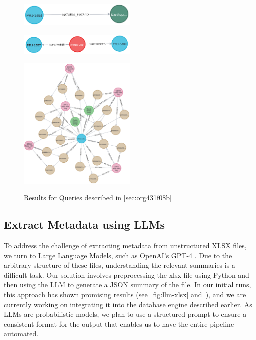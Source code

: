 \documentclass[acmsmall]{acmart}
\begin{document}
\begin{figure}
\begin{minipage}[c][5cm][t]{.5\textwidth}
  \vspace*{\fill}
  \centering
  \includegraphics[width=0.5\textwidth]{figures/query1.png}
  \label{fig:test2}\par\vfill
  \includegraphics[width=0.5\textwidth]{figures/query2.png}
  \label{fig:test3}
\end{minipage}%
\begin{minipage}[c][5cm][t]{.5\textwidth}
  \vspace*{\fill}
  \centering
  \includegraphics[width=0.5\textwidth]{figures/query3.png}
  \label{fig:test1}
\end{minipage}
\label{fig:queries}
\caption{Results for Queries described in \cref{sec:org431f08b}}
\end{figure}

\subsection{Extract Metadata using LLMs}
To address the challenge of extracting metadata from unstructured XLSX files, we turn to Large Language Models, such as OpenAI's GPT-4 \cite{openai2023gpt4}. 
Due to the arbitrary structure
of these files, understanding the relevant summaries is a difficult task. 
Our solution involves preprocessing the xlsx file using Python and then using the 
LLM to generate a JSON summary of the file. 
In our initial runs, this approach has shown promising results (see~\cref{fig:llm-xlsx} and~\cite{kumar_krishna_2023_7668209}), and we
are currently working on integrating it into the database engine described earlier. 
As LLMs are probabilistic models, we plan to use a structured prompt to ensure a consistent format for the output that enables us to have the entire pipeline automated.
\end{document}

